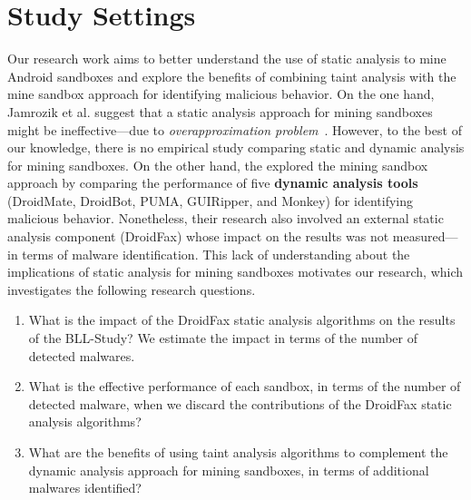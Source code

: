 \section{Study Settings}


Our research work aims to better understand
the use of static analysis to mine Android sandboxes
and explore the benefits of combining taint analysis
with the mine sandbox approach for identifying malicious
behavior. 
On the one hand, Jamrozik et al. suggest that a 
static analysis approach for mining sandboxes
might be ineffective---due to \emph{overapproximation
problem}~\cite{DBLP:conf/icse/JamrozikSZ16The}.
However, to the best of our knowledge,
there is no empirical study comparing
static and dynamic analysis for mining sandboxes.
On the other hand, the \blls explored the mining sandbox approach by comparing
the performance of five {\bf dynamic analysis tools} (DroidMate, DroidBot, PUMA,
GUIRipper, and Monkey) for identifying
malicious behavior. Nonetheless, their
research also involved an external static analysis component (DroidFax)
whose impact on the results was not measured---in terms of malware
identification. 
This lack of understanding about the implications of
static analysis for mining sandboxes motivates
our research, which investigates the following research questions.

\begin{enumerate}[(RQ1)]

\item What is the impact of the DroidFax static analysis algorithms on the results of the BLL-Study?
  We estimate the impact in terms of the number of detected malwares. 
  
  
 \item What is the effective performance of each sandbox, in terms of the number of detected malware, when we
   discard the contributions of the DroidFax static analysis algorithms?

 \item What are the benefits of using taint
   analysis algorithms to complement the dynamic analysis approach for mining sandboxes,
   in terms of additional malwares identified?
\end{enumerate}

